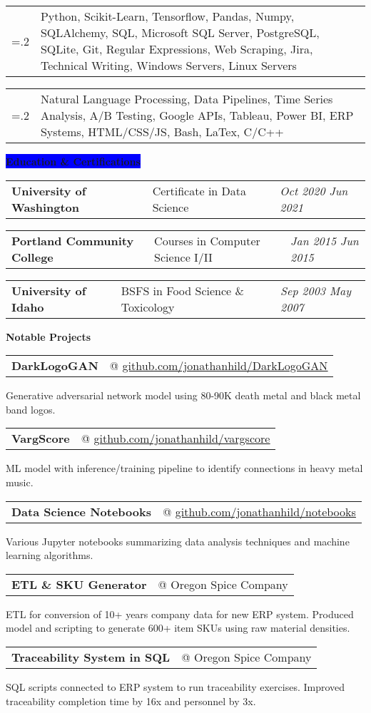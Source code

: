 \documentclass[letterpaper,12pt]{article}[leftmargin=*]
\makeatletter
\newcommand{\projects}[2]{\vspace{4pt}
  \colorbox{Copper}{\color{white}#1\hspace{9pt}\raggedbottom\normalsize\textbf{#2\hspace{4pt}}}
}
\newcommand{\education}[2]{\vspace{4pt}
  \colorbox{Blue}{\color{white}#1\hspace{9pt}\raggedbottom\normalsize\textbf{#2\hspace{4pt}}}
}
\newcommand{\resumeSectionStart}{\begin{itemize}[leftmargin=0.1in]}
\newcommand{\resumeSectionEnd}{\end{itemize}}
\newcommand{\repo}[2]{\href{#1}{\underline{#2}}}
\newcommand{\resumeProject}[3]{
  \item[]
    \begin{tabularx}{0.97\textwidth}{X@{\hspace{60pt}} r}
      \textbf{\color{primary}#1} & {\color{accent}\small#2} \\
    \end{tabularx}
    {#3}
    \vspace{-6pt}
}
\newcommand{\resumeSkill}[2]{
  \vspace{-6pt}
  \item[]
    \begin{tabularx}{0.97\textwidth}{>{\hsize=.2\hsize}X X }
      {\textbf{#1}} & {\small#2} \\
    \end{tabularx}
}
\newcommand{\resumeEducation}[3]{
  \item[]
    \begin{tabularx}{0.97\textwidth}[t]{>{\raggedright}X >{\raggedright\arraybackslash}X >{\raggedleft\arraybackslash}X}
      \textbf{\color{primary}#1} & {\small#2} & \textit{\color{accent}\small#3} \\
    \end{tabularx}
    \vspace{-6pt}
}
\newcommand{\tag}[1]{%
  \tikzmarknode[fill=white,fill opacity=0,draw=subtle!60!subtle,thick,rounded corners,inner sep=0.4ex,text height=1.5ex,text depth=.25ex, text opacity=1]{test}{\hspace{1pt}\small{#1}\hspace{1pt}}
}
\makeatother
\begin{document}
\resumeSectionStart{
  \resumeSkill{Proficient in}{Python, Scikit-Learn, Tensorflow, Pandas, Numpy, SQLAlchemy, SQL, Microsoft SQL Server, PostgreSQL, SQLite, Git, Regular Expressions, Web Scraping, Jira, Technical Writing, Windows Servers, Linux Servers}
  \resumeSkill{Familiar with}{Natural Language Processing, Data Pipelines, Time Series Analysis, A/B Testing, Google APIs, Tableau, Power BI, ERP Systems, HTML/CSS/JS, Bash, LaTex, C/C++}
}
\resumeSectionEnd{}


\education{\faGraduationCap}{Education \& Certifications}
\resumeSectionStart{
  \resumeEducation{University of Washington}{Certificate in Data Science}{Oct 2020 \textemdash{} Jun 2021}
  \resumeEducation{Portland Community College}{Courses in Computer Science I/II}{Jan 2015 \textemdash{} Jun 2015}
  \resumeEducation{University of Idaho}{BSFS in Food Science \& Toxicology}{Sep 2003 \textemdash{} May 2007}
}
\resumeSectionEnd{}

\projects{\faFlask}{Notable Projects}

\resumeSectionStart{
  \resumeProject{DarkLogoGAN \tag{In Process}}{@ \repo{https://github.com/jonathanhild/DarkLogoGAN}{github.com/jonathanhild/DarkLogoGAN}}{Generative adversarial network model using 80-90K death metal and black metal band logos.}
  \resumeProject{VargScore \tag{In Process}}{@ \repo{https://github.com/jonathanhild/vargscore}{github.com/jonathanhild/vargscore}}{ML model with inference/training pipeline to identify connections in heavy metal music.}
  \resumeProject{Data Science Notebooks}{@ \repo{https://github.com/jonathanhild/notebooks}{github.com/jonathanhild/notebooks}}{Various Jupyter notebooks summarizing data analysis techniques and machine learning algorithms.}
  \resumeProject{ETL \& SKU Generator}{@ Oregon Spice Company}{ETL for conversion of 10+ years company data for new ERP system. Produced model and scripting to generate 600+ item SKUs using raw material densities.}
  \resumeProject{Traceability System in SQL}{@ Oregon Spice Company}{SQL scripts connected to ERP system to run traceability exercises. Improved traceability completion time by 16x and personnel by 3x.}
}
\resumeSectionEnd{}

\end{document}

